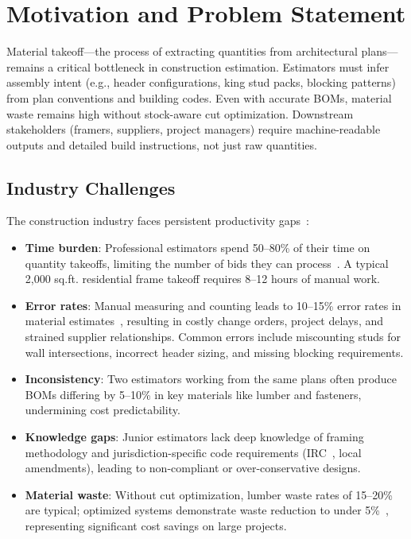 
\section{Motivation and Problem Statement}

Material takeoff---the process of extracting quantities from architectural plans---remains a critical bottleneck in construction estimation.
Estimators must infer assembly intent (e.g., header configurations, king stud packs, blocking patterns) from plan conventions and building codes.
Even with accurate BOMs, material waste remains high without stock-aware cut optimization.
Downstream stakeholders (framers, suppliers, project managers) require machine-readable outputs and detailed build instructions, not just raw quantities.

\subsection{Industry Challenges}

The construction industry faces persistent productivity gaps~\cite{mckinsey2017construction}:

\begin{itemize}
  \item \textbf{Time burden}: Professional estimators spend 50--80\% of their time on quantity takeoffs, limiting the number of bids they can process~\cite{rics2019takeoff}.
  A typical 2,000 sq.ft. residential frame takeoff requires 8--12 hours of manual work.

  \item \textbf{Error rates}: Manual measuring and counting leads to 10--15\% error rates in material estimates~\cite{deloitte2023outlook}, resulting in costly change orders, project delays, and strained supplier relationships.
  Common errors include miscounting studs for wall intersections, incorrect header sizing, and missing blocking requirements.

  \item \textbf{Inconsistency}: Two estimators working from the same plans often produce BOMs differing by 5--10\% in key materials like lumber and fasteners, undermining cost predictability.

  \item \textbf{Knowledge gaps}: Junior estimators lack deep knowledge of framing methodology and jurisdiction-specific code requirements (IRC~\cite{irc2021}, local amendments), leading to non-compliant or over-conservative designs.

  \item \textbf{Material waste}: Without cut optimization, lumber waste rates of 15--20\% are typical; optimized systems demonstrate waste reduction to under 5\%~\cite{manrique2007framex}, representing significant cost savings on large projects.
\end{itemize}

